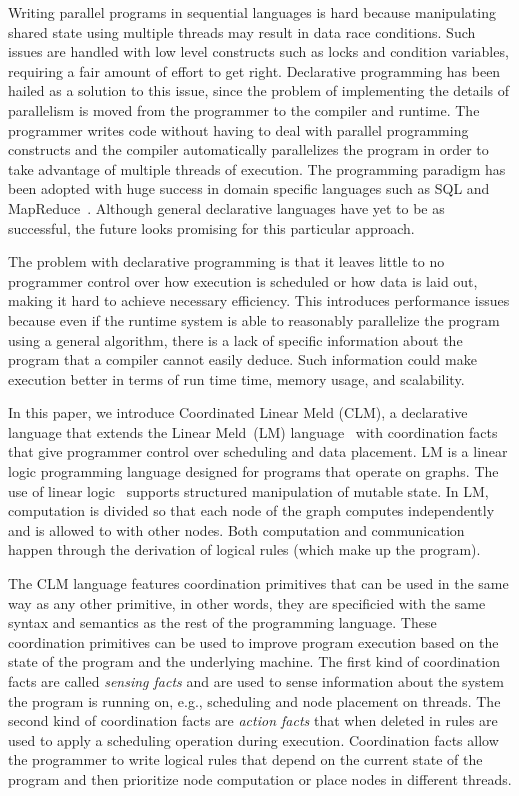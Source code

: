 Writing parallel programs in sequential languages is hard because manipulating
shared state using multiple threads may result in data race conditions. Such
issues are handled with low level constructs such as locks and condition
variables, requiring a fair amount of effort to get right.  Declarative
programming has been hailed as a solution to this issue, since the problem of
implementing the details of parallelism is moved from the programmer to the
compiler and runtime. The programmer writes code without having to deal with
parallel programming constructs and the compiler automatically parallelizes the
program in order to take advantage of multiple threads of execution.  The
programming paradigm has been adopted with huge success in domain specific
languages such as SQL and MapReduce~\cite{Dean:2008:MSD:1327452.1327492}.
Although general declarative languages have yet to be as successful, the future
looks promising for this particular approach.

The problem with declarative programming is that it leaves little to no
programmer control over how execution is scheduled or how data is laid out,
making it hard to achieve necessary efficiency. This introduces
performance issues because even if the runtime system is able to
reasonably parallelize the program using a general algorithm, there
is a lack of specific information about the program that a compiler
cannot easily deduce. Such information could make execution better in
terms of run time time, memory usage, and scalability.

In this paper, we introduce Coordinated Linear Meld (CLM), a declarative
language that extends the Linear Meld~(LM)
language~\cite{cruz-iclp14,cruz-ppdp14} with coordination facts that give
programmer control over scheduling and data placement. LM is a linear logic
programming language designed for programs that operate on graphs.  The use
of linear logic~\cite{girard-87} supports structured manipulation of mutable
state. In LM, computation is divided so that each node of the graph computes
independently and is allowed to  with other nodes.  Both
computation and communication happen through the derivation of logical rules
(which make up the program).

The CLM language features coordination primitives that can be used in the same
way as any other primitive, in other words, they are specificied with the same
syntax and semantics as the rest of the programming language. These coordination
primitives can be used to improve program execution based on the state of the
program and the underlying machine. The first kind of coordination facts are
called \emph{sensing facts} and are used to sense information about the system
the program is running on, e.g., scheduling and node placement on threads. The
second kind of coordination facts are \emph{action facts} that when deleted in
rules are used to apply a scheduling operation during execution. Coordination
facts allow the programmer to write logical rules that depend on the current
state of the program and then prioritize node computation or place nodes in
different threads.

